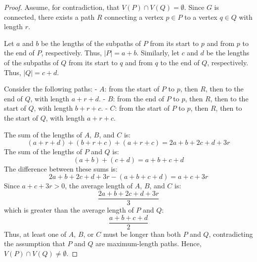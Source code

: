 \documentclass[12 pt]{article}
\begin{document}
\begin{proof}
    Assume, for contradiction, that \( V(P) \cap V(Q) = \emptyset \). Since \( G \) is connected, there exists a path \( R \) connecting a vertex \( p \in P \) to a vertex \( q \in Q \) with length \( r \).

    Let \( a \) and \( b \) be the lengths of the subpaths of \( P \) from its start to \( p \) and from \( p \) to the end of \( P \), respectively. Thus, \( |P| = a + b \). Similarly, let \( c \) and \( d \) be the lengths of the subpaths of \( Q \) from its start to \( q \) and from \( q \) to the end of \( Q \), respectively. Thus, \( |Q| = c + d \).
    
    Consider the following paths:
    - \( A \): from the start of \( P \) to \( p \), then \( R \), then to the end of \( Q \), with length \( a + r + d \).
    - \( B \): from the end of \( P \) to \( p \), then \( R \), then to the start of \( Q \), with length \( b + r + c \).
    - \( C \): from the start of \( P \) to \( p \), then \( R \), then to the start of \( Q \), with length \( a + r + c \).
    
    The sum of the lengths of \( A \), \( B \), and \( C \) is:
    \[
    (a + r + d) + (b + r + c) + (a + r + c) = 2a + b + 2c + d + 3r
    \]
    The sum of the lengths of \( P \) and \( Q \) is:
    \[
    (a + b) + (c + d) = a + b + c + d
    \]
    The difference between these sums is:
    \[
    2a + b + 2c + d + 3r - (a + b + c + d) = a + c + 3r
    \]
    Since \( a + c + 3r > 0 \), the average length of \( A \), \( B \), and \( C \) is:
    \[
    \frac{2a + b + 2c + d + 3r}{3}
    \]
    which is greater than the average length of \( P \) and \( Q \):
    \[
    \frac{a + b + c + d}{2}
    \]
    Thus, at least one of \( A \), \( B \), or \( C \) must be longer than both \( P \) and \( Q \), contradicting the assumption that \( P \) and \( Q \) are maximum-length paths. Hence, \( V(P) \cap V(Q) \neq \emptyset \).
        


\end{proof}
\end{document}

